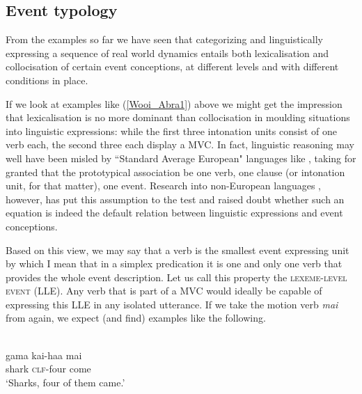 \subsection{Event typology}\label{sec:event-typology}

From the examples so far we have seen that categorizing and linguistically expressing a sequence of real world dynamics entails both lexicalisation and collocisation of certain event conceptions, at different levels and with different conditions in place. 

If we look at examples like (\ref{Wooi_Abra1}) above we might get the impression that lexicalisation is no more dominant than collocisation in moulding situations into linguistic expressions: while the first three intonation units consist of one verb each, the second three each display a MVC. In fact, linguistic reasoning may well have been misled by ``Standard Average European" languages like , taking for granted that the prototypical association be one verb, one clause (or intonation unit, for that matter), one event. Research into non-European languages \citep{Pawley1987, pawley2011event, baker2010complex, foley2010events, bohnemeyer2007principles}, however, has put this assumption to the test and raised doubt whether such an equation is indeed the default relation between linguistic expressions and event conceptions.

\largerpage[-1]
Based on this view, we may say that a verb is the smallest event expressing unit by which I mean that in a simplex predication it is one and only one verb that provides the whole event description. Let us call this property the \textsc{lexeme-level event} (LLE). Any verb that is part of a MVC would ideally be capable of expressing this LLE in any isolated utterance. If we take the motion verb \textit{mai} from  again, we expect (and find) examples like the following.

\ea \label{WMH_Julio_goat309}
\\
\gll gama kai-haa mai \\
shark \textsc{clf}-four come \\
\glft `Sharks, four of them came.' \\ 
\z

